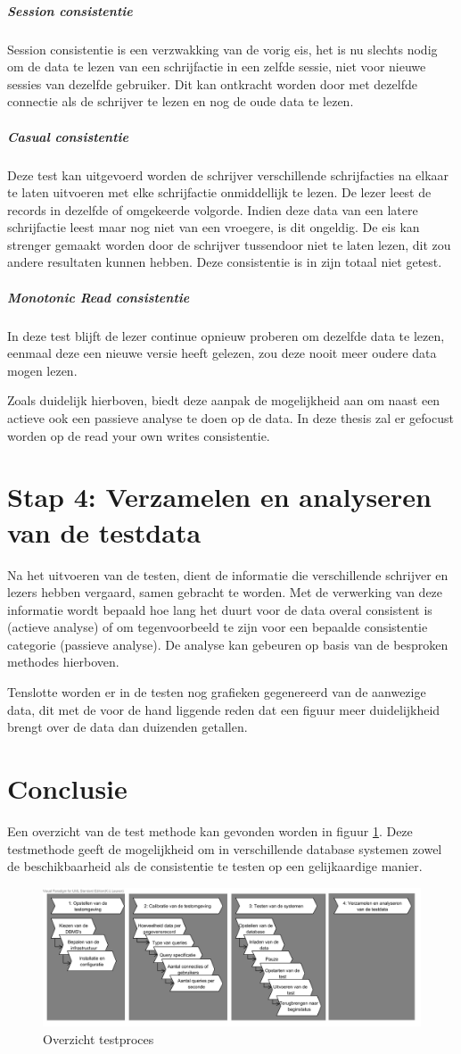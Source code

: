 \subparagraph{Session consistentie} Session consistentie is een verzwakking van de vorig eis, het is nu slechts nodig om de data te lezen van een schrijfactie in een zelfde sessie, niet voor nieuwe sessies van dezelfde gebruiker. Dit kan ontkracht worden door met dezelfde connectie als de schrijver te lezen en nog de oude data te lezen. 

\subparagraph{Casual consistentie} Deze test kan uitgevoerd worden de schrijver verschillende schrijfacties na elkaar te laten uitvoeren met elke schrijfactie onmiddellijk te lezen. De lezer leest de records in dezelfde of omgekeerde volgorde. Indien deze data van een latere schrijfactie leest maar nog niet van een vroegere, is dit ongeldig. De eis kan strenger gemaakt worden door de schrijver tussendoor niet te laten lezen, dit zou andere resultaten kunnen hebben. Deze consistentie is in zijn totaal niet getest. 

\subparagraph{Monotonic Read consistentie} In deze test blijft de lezer continue opnieuw proberen om dezelfde data te lezen, eenmaal deze een nieuwe versie heeft gelezen, zou deze nooit meer oudere data mogen lezen. 

Zoals duidelijk hierboven, biedt deze aanpak de mogelijkheid aan om naast een actieve ook een passieve analyse te doen op de data. In deze thesis zal er gefocust worden op de read your own writes consistentie. 

\section{Stap 4: Verzamelen en analyseren van de testdata}
Na het uitvoeren van de testen, dient de informatie die verschillende schrijver en lezers hebben vergaard, samen gebracht te worden. Met de verwerking van deze informatie wordt bepaald hoe lang het duurt voor de data overal consistent is (actieve analyse) of om  tegenvoorbeeld te zijn voor een bepaalde consistentie categorie (passieve analyse). De analyse kan gebeuren op basis van de besproken methodes hierboven. 

Tenslotte worden er in de testen nog grafieken gegenereerd van de aanwezige data, dit met de voor de hand liggende reden dat een figuur meer duidelijkheid brengt over de data dan duizenden getallen.  

\section{Conclusie}
Een overzicht van de test methode kan gevonden worden in figuur \ref{fig:test-process-detailed}. Deze testmethode geeft de mogelijkheid om in verschillende database systemen zowel de beschikbaarheid als de consistentie te testen op een gelijkaardige manier. 

\begin{figure}[htb!]
\centering
\includegraphics[width=\linewidth]{img/Test-Process-Detailed-Overview}
\caption{Overzicht testproces}
\label{fig:test-process-detailed}
\end{figure}
